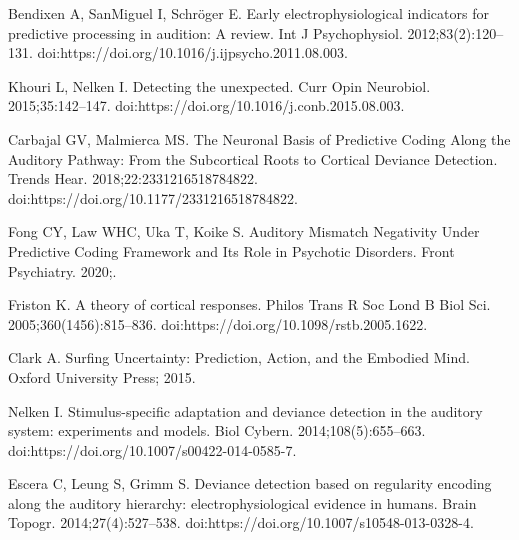 \documentclass[10pt,letterpaper]{article}
\begin{document}
%
%
% 
\begin{thebibliography}{100}

  Bendixen A, SanMiguel I, Schr{\"o}ger E.
  \newblock Early electrophysiological indicators for predictive processing in
    audition: {A} review.
  \newblock Int J Psychophysiol. 2012;83(2):120--131.
  \newblock doi:{https://doi.org/10.1016/j.ijpsycho.2011.08.003}.
  
  Khouri L, Nelken I.
  \newblock Detecting the unexpected.
  \newblock Curr Opin Neurobiol. 2015;35:142--147.
  \newblock doi:{https://doi.org/10.1016/j.conb.2015.08.003}.
  
  Carbajal GV, Malmierca MS.
  \newblock The Neuronal Basis of Predictive Coding Along the Auditory Pathway:
    From the Subcortical Roots to Cortical Deviance Detection.
  \newblock Trends Hear. 2018;22:2331216518784822.
  \newblock doi:{https://doi.org/10.1177/2331216518784822}.
  
  Fong CY, Law WHC, Uka T, Koike S.
  \newblock Auditory Mismatch Negativity Under Predictive Coding Framework and
    Its Role in Psychotic Disorders.
  \newblock Front Psychiatry. 2020;.
  
  Friston K.
  \newblock A theory of cortical responses.
  \newblock Philos Trans R Soc Lond B Biol Sci. 2005;360(1456):815--836.
  \newblock doi:{https://doi.org/10.1098/rstb.2005.1622}.
  
  Clark A.
  \newblock Surfing Uncertainty: Prediction, Action, and the Embodied Mind.
  \newblock Oxford University Press; 2015.
  
  Nelken I.
  \newblock Stimulus-specific adaptation and deviance detection in the auditory
    system: experiments and models.
  \newblock Biol Cybern. 2014;108(5):655--663.
  \newblock doi:{https://doi.org/10.1007/s00422-014-0585-7}.
  
  Escera C, Leung S, Grimm S.
  \newblock Deviance detection based on regularity encoding along the auditory
    hierarchy: electrophysiological evidence in humans.
  \newblock Brain Topogr. 2014;27(4):527--538.
  \newblock doi:{https://doi.org/10.1007/s10548-013-0328-4}.
  

\end{thebibliography}
\end{document}
